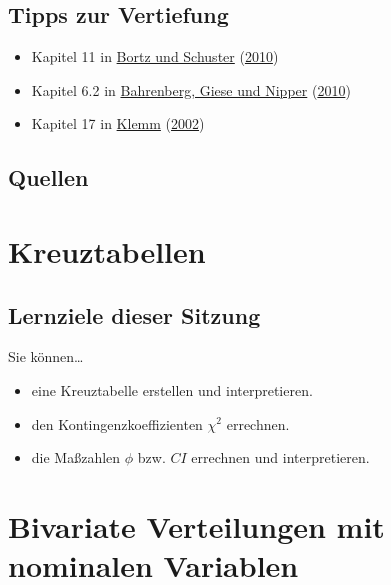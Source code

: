 \documentclass[
  ngerman,
]{article}
\providecommand{\tightlist}{%
  \setlength{\itemsep}{0pt}\setlength{\parskip}{0pt}}
\begin{document}
\hypertarget{tipps-zur-vertiefung-7}{%
\subsection{Tipps zur Vertiefung}\label{tipps-zur-vertiefung-7}}

\begin{itemize}
\tightlist
\item
  Kapitel 11 in \protect\hyperlink{ref-bortz}{Bortz und Schuster} (\protect\hyperlink{ref-bortz}{2010})
\item
  Kapitel 6.2 in \protect\hyperlink{ref-bahrenberg}{Bahrenberg, Giese und Nipper} (\protect\hyperlink{ref-bahrenberg}{2010})
\item
  Kapitel 17 in \protect\hyperlink{ref-klemm}{Klemm} (\protect\hyperlink{ref-klemm}{2002})
\end{itemize}

\hypertarget{quellen-7}{%
\subsection{Quellen}\label{quellen-7}}

\hypertarget{kreuztabellen}{%
\section{Kreuztabellen}\label{kreuztabellen}}

\hypertarget{lernziele-dieser-sitzung-8}{%
\subsection{Lernziele dieser Sitzung}\label{lernziele-dieser-sitzung-8}}

Sie können\ldots{}

\begin{itemize}
\tightlist
\item
  eine Kreuztabelle erstellen und interpretieren.
\item
  den Kontingenzkoeffizienten \(\chi^2\) errechnen.
\item
  die Maßzahlen \(\phi\) bzw. \(\mathit{CI}\) errechnen und interpretieren.
\end{itemize}

\hypertarget{bivariate-verteilungen-mit-nominalen-variablen}{%
\section{Bivariate Verteilungen mit nominalen Variablen}\label{bivariate-verteilungen-mit-nominalen-variablen}}
\end{document}
